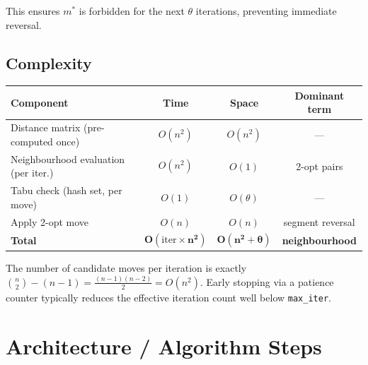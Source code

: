 \documentclass[12pt,a4paper]{article}
\begin{document}
This ensures $m^*$ is forbidden for the next $\theta$ iterations,
preventing immediate reversal.

\subsection{Complexity}

\begin{center}
\begin{tabularx}{\linewidth}{Xccc}
\toprule
\textbf{Component} & \textbf{Time} & \textbf{Space} & \textbf{Dominant term} \\
\midrule
Distance matrix (pre-computed once) & $O(n^2)$ & $O(n^2)$ & --- \\
Neighbourhood evaluation (per iter.) & $O(n^2)$ & $O(1)$ & 2-opt pairs \\
Tabu check (hash set, per move) & $O(1)$ & $O(\theta)$ & --- \\
Apply 2-opt move & $O(n)$ & $O(n)$ & segment reversal \\
\midrule
\textbf{Total} & $\boldsymbol{O(\mathrm{iter} \times n^2)}$ &
  $\boldsymbol{O(n^2 + \theta)}$ & \textbf{neighbourhood} \\
\bottomrule
\end{tabularx}
\end{center}

The number of candidate moves per iteration is exactly
$\binom{n}{2} - (n-1) = \tfrac{(n-1)(n-2)}{2} = O(n^2)$.
Early stopping via a patience counter typically reduces the effective
iteration count well below \texttt{max\_iter}.

\section{Architecture / Algorithm Steps}
\end{document}
